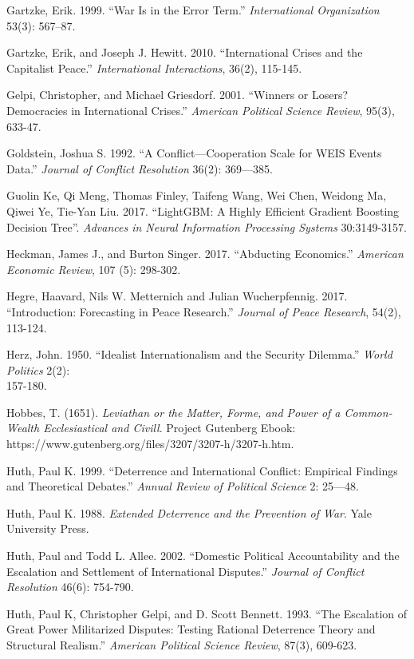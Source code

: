 \documentclass[
]{article}
\begin{document}
Gartzke, Erik. 1999. ``War Is in the Error Term.'' \emph{International
Organization} 53(3): 567--87.

Gartzke, Erik, and Joseph J. Hewitt. 2010. ``International Crises and
the Capitalist Peace.'' \emph{International Interactions}, 36(2),
115-145.

Gelpi, Christopher, and Michael Griesdorf. 2001. ``Winners or Losers?
Democracies in International Crises.'' \emph{American Political Science
Review}, 95(3), 633-47.

Goldstein, Joshua S. 1992. ``A Conflict---Cooperation Scale for WEIS
Events Data.'' \emph{Journal of Conflict Resolution} 36(2): 369---385.

Guolin Ke, Qi Meng, Thomas Finley, Taifeng Wang, Wei Chen, Weidong Ma,
Qiwei Ye, Tie-Yan Liu. 2017. ``LightGBM: A Highly Efficient Gradient
Boosting Decision Tree''. \emph{Advances in Neural Information
Processing Systems} 30:3149-3157.

Heckman, James J., and Burton Singer. 2017. ``Abducting Economics.''
\emph{American Economic Review}, 107 (5): 298-302.

Hegre, Haavard, Nils W. Metternich and Julian Wucherpfennig. 2017.
``Introduction: Forecasting in Peace Research.'' \emph{Journal of Peace
Research}, 54(2), 113-124.

Herz, John. 1950. ``Idealist Internationalism and the Security
Dilemma.'' \emph{World Politics} 2(2):\\
157-180.

Hobbes, T. (1651). \emph{Leviathan or the Matter, Forme, and Power of a
Common-Wealth Ecclesiastical and Civill}. Project Gutenberg Ebook:~
https://www.gutenberg.org/files/3207/3207-h/3207-h.htm.

Huth, Paul K. 1999. ``Deterrence and International Conflict: Empirical
Findings and Theoretical Debates.'' \emph{Annual Review of Political
Science} 2: 25---48.~

Huth, Paul K. 1988. \emph{Extended Deterrence and the Prevention of
War}. Yale University Press.

Huth, Paul and Todd L. Allee. 2002. ``Domestic Political Accountability
and the Escalation and Settlement of International Disputes.''
\emph{Journal of Conflict Resolution} 46(6): 754-790.

Huth, Paul K, Christopher Gelpi, and D. Scott Bennett. 1993. ``The
Escalation of Great Power Militarized Disputes: Testing Rational
Deterrence Theory and Structural Realism.'' \emph{American Political
Science Review}, 87(3), 609-623.
\end{document}
